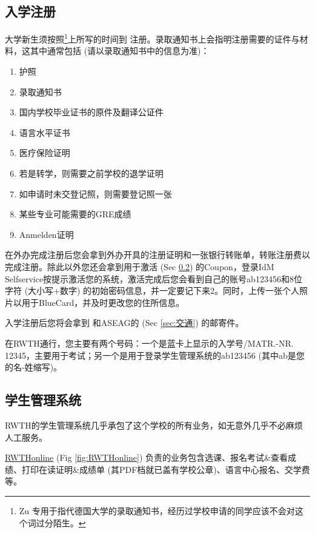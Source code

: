   \subsection{入学注册}\label{subsec:入学注册}

    大学新生须按照\footnote{Zu 专用于指代德国大学的录取通知书，经历过学校申请的同学应该不会对这个词过分陌生。}上所写的时间到\href{https://www.rwth-aachen.de/go/id/pvd/lidx/1}{} 注册。录取通知书上会指明注册需要的证件与材料，这其中通常包括 (请以录取通知书中的信息为准)：
    \begin{enumerate}
      \item 护照
      \item 录取通知书
      \item 国内学校毕业证书的原件及翻译公证件
      \item 语言水平证书
      \item 医疗保险证明
      \item 若是转学，则需要之前学校的退学证明
      \item 如申请时未交登记照，则需要登记照一张
      \item 某些专业可能需要的GRE成绩
      \item Anmelden证明
    \end{enumerate}
    
    在外办完成注册后您会拿到外办开具的注册证明和一张银行转账单，转账注册费以完成注册。除此以外您还会拿到用于激活 (Sec \ref{subsec:学生管理系统}) 的Coupon，登录IdM Selfservice按提示激活您的系统，激活完成后您会看到自己的账号ab123456和8位字符 (大小写+数字) 的初始密码信息，并一定要记下来2。同时，上传一张个人照片以用于BlueCard，并及时更改您的住所信息。

    入学注册后您将会拿到 和ASEAG的 (Sec \ref{sec:交通}) 的邮寄件。

    在RWTH通行，您主要有两个号码：一个是蓝卡上显示的入学号/MATR.-NR. 12345，主要用于考试；另一个是用于登录学生管理系统的ab123456 (其中ab是您的名-姓缩写)。

  \subsection{学生管理系统}\label{subsec:学生管理系统}

    RWTH的学生管理系统几乎承包了这个学校的所有业务，如无意外几乎不必麻烦人工服务。

    \href{https://online.rwth-aachen.de/}{RWTHonline} (Fig \ref{fig:RWTHonline}) 负责的业务包含选课、报名考试\&查看成绩、打印在读证明\&成绩单 (其PDF档就已盖有学校公章)、语言中心报名、交学费等。

